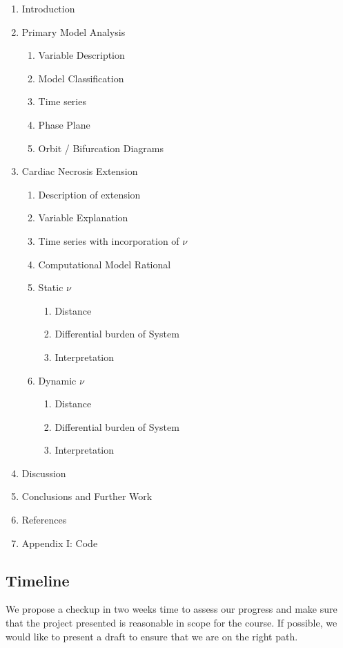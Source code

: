 \documentclass[11pt]{article}
\begin{document}
\begin{enumerate}
	\item Introduction
	\item Primary Model Analysis
	\begin{enumerate}
		\item Variable Description
		\item Model Classification
		\item Time series 
		\item Phase Plane
		\item Orbit / Bifurcation Diagrams
	\end{enumerate}
	\item Cardiac Necrosis Extension
	\begin{enumerate}
		\item Description of extension
		\item Variable Explanation
		\item Time series with incorporation of $\nu$
		\item Computational Model Rational
		\item Static $\nu$
		\begin{enumerate}
			\item Distance
			\item Differential burden of System 
			\item Interpretation
		\end{enumerate}
		\item Dynamic $\nu$
		\begin{enumerate}
			\item Distance
			\item Differential burden of System 
			\item Interpretation
		\end{enumerate}
	\end{enumerate}
	\item Discussion
	\item Conclusions and Further Work
	\item References
	\item Appendix I: Code 
\end{enumerate}


\subsection{Timeline} %
\label{sub:timeline}

We propose a checkup in two weeks time to assess our progress and make sure that the project presented is reasonable in scope for the course. If possible, we would like to present a draft to ensure that we are on the right path. 
\end{document}
